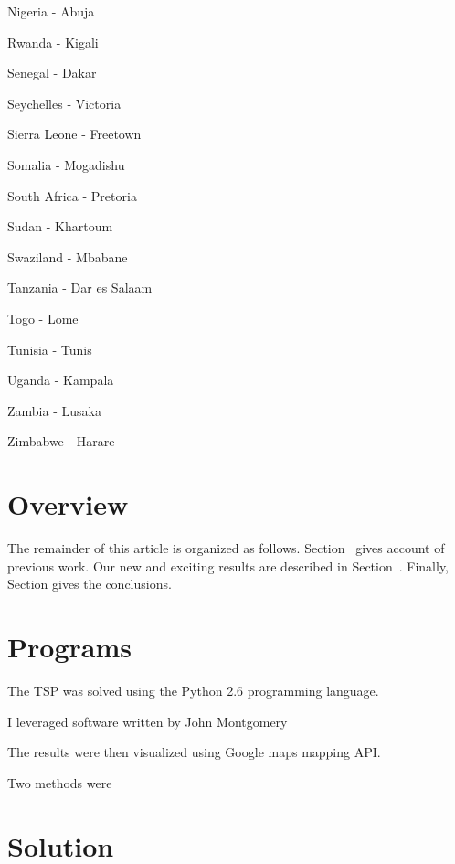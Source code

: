 \documentclass[12pt]{article}
\begin{document}
\begin{multicols}{3}
\begin{enumerate*}
\item Nigeria - Abuja
\item Rwanda - Kigali
\item Senegal - Dakar
\item Seychelles - Victoria
\item Sierra Leone - Freetown
\item Somalia - Mogadishu
\item South Africa - Pretoria 
\item Sudan - Khartoum
\item Swaziland - Mbabane
\item Tanzania - Dar es Salaam
\item Togo - Lome
\item Tunisia - Tunis
\item Uganda - Kampala
\item Zambia - Lusaka
\item Zimbabwe - Harare
\end{enumerate*}
\end{multicols}

\section{Overview}
The remainder of this article is organized as follows.
Section~ gives account of previous work.
Our new and exciting results are described in Section~.
Finally, Section gives the conclusions.

\section{Programs}

The TSP was solved using the Python 2.6 programming language.

I leveraged software written by John Montgomery 

The results were then visualized using Google maps mapping API. 

Two methods were 

\section{Solution}
\end{document}
